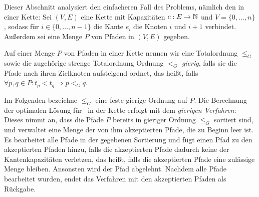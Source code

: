 Dieser Abschnitt analysiert den einfacheren Fall des Problems, nämlich den in einer Kette:
Sei $(V,E)$ eine Kette mit Kapazitäten $c: E \to \mathbb N$ und $V=\{0,\dots,n\}$, sodass für $i \in \{0,\dots,n-1\}$
die Kante $e_i$ die Knoten $i$ und $i+1$ verbindet.
Außerdem sei eine Menge $P$ von Pfaden in $(V,E)$ gegeben.
\begin{definition}
    Auf einer Menge $P$ von Pfaden in einer Kette nennen wir eine Totalordnung $\leq_G$ sowie die zugehörige strenge Totalordnung
    Ordnung $<_G$ {\em gierig},
    falls sie die Pfade nach ihren Zielknoten aufsteigend ordnet, das heißt, falls
    $\forall p, q \in P \colon t_p < t_q \Rightarrow p <_G q$.
\end{definition}
Im Folgenden bezeichne $\leq_G$ eine feste gierige Ordnung auf $P$.
Die Berechnung der optimalen Lösung für \CallControl\ in der Kette erfolgt mit dem {\em gierigen Verfahren}:
Dieses nimmt an, dass die Pfade $P$ bereits in gieriger Ordnung $\leq_G$ sortiert sind,
und verwaltet eine Menge der von ihm akzeptierten Pfade, die zu Beginn leer ist.
Es bearbeitet alle Pfade in der gegebenen Sortierung und fügt einen Pfad zu den akzeptierten Pfaden hinzu, falls die
akzeptierten Pfade dadurch keine der Kantenkapazitäten verletzen, das heißt, falls die akzeptierten Pfade eine zulässige Menge bleiben.
Ansonsten wird der Pfad abgelehnt.
Nachdem alle Pfade bearbeitet wurden, endet das Verfahren mit den akzeptierten Pfaden als Rückgabe.

